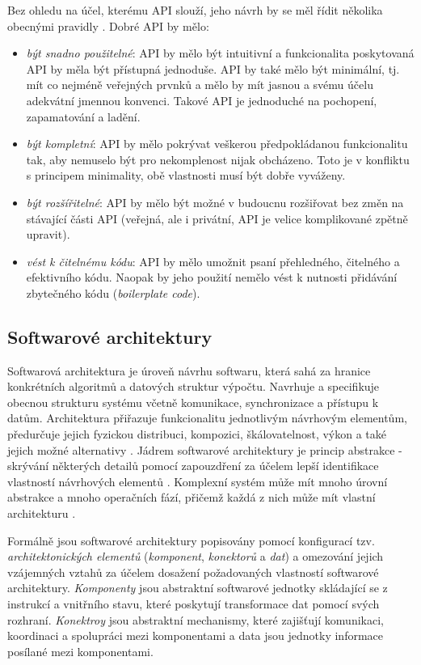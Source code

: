Bez ohledu na účel, kterému API slouží, jeho návrh by se měl řídit několika obecnými pravidly \cite{Bloch06}. Dobré API by mělo:
\begin{itemize}
  \item{\textit{být snadno použitelné}}: API by mělo být intuitivní a funkcionalita poskytovaná API by měla být přístupná jednoduše. API by také mělo být minimální, tj. mít co nejméně veřejných prvnků a mělo by mít jasnou a svému účelu adekvátní jmennou konvenci. Takové API je jednoduché na pochopení, zapamatování a ladění.
  \item{\textit{být kompletní}}: API by mělo pokrývat veškerou předpokládanou funkcionalitu tak, aby nemuselo být pro nekomplenost nijak obcházeno. Toto je v konfliktu s principem minimality, obě vlastnosti musí být dobře vyváženy.
  \item{\textit{být rozšířitelné}}: API by mělo být možné v budoucnu rozšiřovat bez změn na stávající části API (veřejná, ale i privátní, API je velice komplikované zpětně upravit).
  \item{\textit{vést k čitelnému kódu}}: API by mělo umožnit psaní přehledného, čitelného a efektivního kódu. Naopak by jeho použití nemělo vést k nutnosti přidávání zbytečného kódu (\textit{boilerplate code}).
\end{itemize}

\subsection{Softwarové architektury}
\label{sec:architectures}
Softwarová architektura je úroveň návrhu softwaru, která sahá za hranice konkrétních algoritmů a datových struktur výpočtu. Navrhuje a specifikuje obecnou strukturu systému včetně komunikace,
synchronizace a přístupu k datům. Architektura přiřazuje funkcionalitu jednotlivým návrhovým elementům, předurčuje jejich fyzickou distribuci, kompozici, škálovatelnost, výkon a také jejich možné alternativy \cite{Garlan94}. Jádrem softwarové architektury je princip abstrakce - skrývání některých detailů pomocí zapouzdření za účelem lepší identifikace vlastností návrhových elementů \cite{Shaw90}. Komplexní systém může mít mnoho úrovní abstrakce a mnoho operačních fází, přičemž každá z nich může mít vlastní architekturu \cite{Bass98}.

Formálně jsou softwarové architektury popisovány pomocí konfigurací tzv. \textit{architektonických elementů} (\textit{komponent}, \textit{konektorů} a \textit{dat}) a omezování jejich vzájemných vztahů za účelem dosažení požadovaných vlastností softwarové architektury. \textit{Komponenty} jsou abstraktní softwarové jednotky skládající se z instrukcí a vnitřního stavu, které poskytují transformace dat pomocí svých rozhraní. \textit{Konektroy} jsou abstraktní mechanismy, které zajišťují komunikaci, koordinaci a spolupráci mezi komponentami a data jsou jednotky informace posílané mezi komponentami. \cite{Shaw97}

